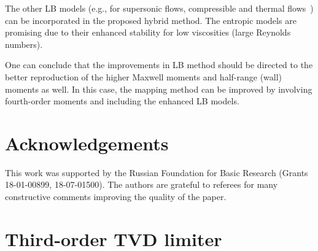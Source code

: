 \documentclass{elsarticle} %
\begin{document}
The other LB models (e.g., for supersonic flows, compressible and thermal flows~\cite{Chen2010, Frapolli2015, Frapolli2016})
can be incorporated in the proposed hybrid method.
The entropic models are promising due to their enhanced stability for low viscosities (large Reynolds numbers).


One can conclude that the improvements in LB method should be directed
to the better reproduction of the higher Maxwell moments and half-range (wall) moments as well.
In this case, the mapping method can be improved by involving fourth-order moments
and including the enhanced LB models.

\section*{Acknowledgements}

This work was supported by the Russian Foundation for Basic Research (Grants 18-01-00899, 18-07-01500).
The authors are grateful to referees for many constructive comments improving the quality of the paper.

\appendix

\section{Third-order TVD limiter}\label{sec:limiter}
\end{document}
